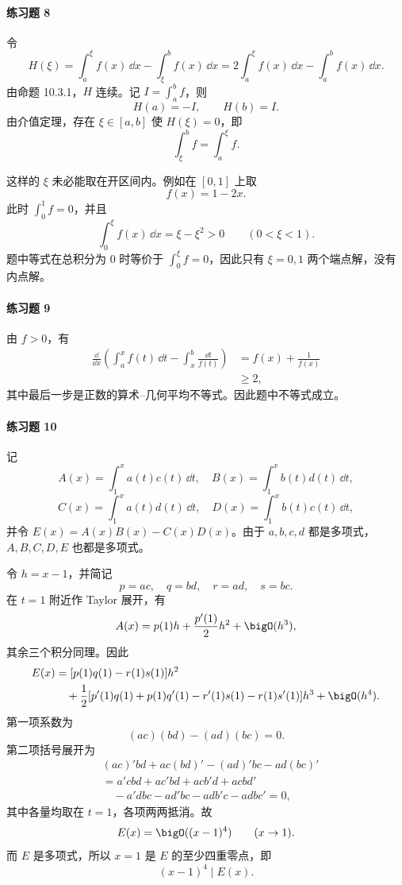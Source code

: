 \paragraph{练习题 8}
\begin{xsolution}
令
\[
  H(\xi)=\int_a^\xi f(x)\,\dd x-\int_\xi^b f(x)\,\dd x
  =2\int_a^\xi f(x)\,\dd x-\int_a^b f(x)\,\dd x.
\]
由命题 10.3.1，$H$ 连续。记 $I=\int_a^b f$，则
\[
  H(a)=-I,
  \qquad
  H(b)=I.
\]
由介值定理，存在 $\xi\in[a,b]$ 使 $H(\xi)=0$，即
\[
  \int_\xi^b f=\int_a^\xi f.
\]

这样的 $\xi$ 未必能取在开区间内。例如在 $[0,1]$ 上取
\[
  f(x)=1-2x.
\]
此时 $\int_0^1 f=0$，并且
\[
  \int_0^\xi f(x)\,\dd x=\xi-\xi^2>0
  \qquad(0<\xi<1).
\]
题中等式在总积分为 $0$ 时等价于 $\int_0^\xi f=0$，因此只有 $\xi=0,1$ 两个端点解，没有内点解。
\end{xsolution}

\paragraph{练习题 9}
\begin{xsolution}
由 $f>0$，有
\begin{align*}
  \frac{\dd}{\dd x}
  \left(\int_a^x f(t)\,\dd t-\int_x^b\frac{\dd t}{f(t)}\right)
  &=f(x)+\frac1{f(x)}\\
  &\geqslant2,
\end{align*}
其中最后一步是正数的算术--几何平均不等式。因此题中不等式成立。
\end{xsolution}

\paragraph{练习题 10}
\begin{xsolution}
记
\[
  A(x)=\int_1^x a(t)c(t)\,\dd t,\quad
  B(x)=\int_1^x b(t)d(t)\,\dd t,
\]
\[
  C(x)=\int_1^x a(t)d(t)\,\dd t,\quad
  D(x)=\int_1^x b(t)c(t)\,\dd t,
\]
并令 $E(x)=A(x)B(x)-C(x)D(x)$。由于 $a,b,c,d$ 都是多项式，$A,B,C,D,E$ 也都是多项式。

令 $h=x-1$，并简记
\[
  p=ac,\quad q=bd,\quad r=ad,\quad s=bc.
\]
在 $t=1$ 附近作 Taylor 展开，有
\[
  A(x)=p(1)h+\frac{p'(1)}2h^2+\bigO(h^3),
\]
其余三个积分同理。因此
\begin{align*}
  E(x)
  &=[p(1)q(1)-r(1)s(1)]h^2\\
  &\quad+\frac12[p'(1)q(1)+p(1)q'(1)-r'(1)s(1)-r(1)s'(1)]h^3
  +\bigO(h^4).
\end{align*}
第一项系数为
\[
  (ac)(bd)-(ad)(bc)=0.
\]
第二项括号展开为
\begin{align*}
 &(ac)'bd+ac(bd)'-(ad)'bc-ad(bc)'\\
 &=a'cbd+ac'bd+acb'd+acbd'\\
 &\quad-a'dbc-ad'bc-adb'c-adbc'=0,
\end{align*}
其中各量均取在 $t=1$，各项两两抵消。故
\[
  E(x)=\bigO((x-1)^4)\qquad(x\to1).
\]
而 $E$ 是多项式，所以 $x=1$ 是 $E$ 的至少四重零点，即
\[
  \boxed{(x-1)^4\mid E(x)}.
\]
\end{xsolution}

